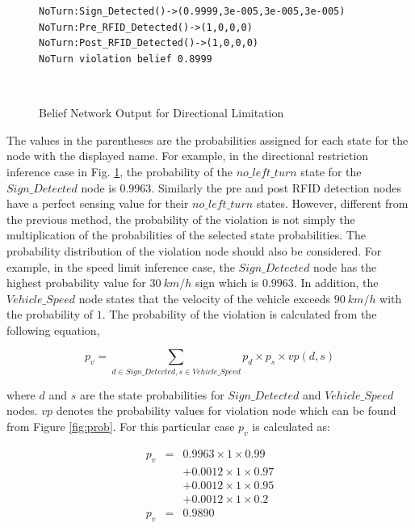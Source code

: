 \documentclass[letterpaper, 10 pt, conference]{ieeeconf}
\newenvironment{mylisting}
{~\par~\begin{list}{}{\setlength{\leftmargin}{1em}}\item\scriptsize\bfseries}
{\end{list}~\par}
\begin{document}
\begin{figure}[thb]
      \centering
		   \begin{mylisting}
\begin{verbatim}
NoTurn:Sign_Detected()->(0.9999,3e-005,3e-005,3e-005)
NoTurn:Pre_RFID_Detected()->(1,0,0,0)
NoTurn:Post_RFID_Detected()->(1,0,0,0)
NoTurn violation belief 0.8999
\end{verbatim}
\end{mylisting}
      \caption{Belief Network Output for Directional Limitation}
      \label{fig:BNDirection}
\end{figure}

The values in the parentheses are the probabilities assigned for each state for the node with the displayed name. For example, in the directional restriction inference case in Fig. \ref{fig:BNDirection},  the probability of the $no\_left\_turn$ state for the $Sign\_Detected$ node is $0.9963$. Similarly the pre and post RFID detection nodes have a perfect sensing value for their $no\_left\_turn$ states. However, different from the previous method, the probability of the violation is not simply the multiplication of the probabilities of the selected state probabilities. The probability distribution of the violation node should also be considered. For example, in the speed limit inference case, the $Sign\_Detected$ node has the highest probability value for $30~km/h$ sign which is $0.9963$. In addition, the $Vehicle\_Speed$ node states that the velocity of the vehicle exceeds $90~km/h$ with the probability of $1$. The probability of the violation is calculated from the following equation,


\begin{equation}
	p_{v} = \sum_{d\in{Sign\_Detected},s\in{Vehicle\_Speed}}p_{d} \times p_{s} \times vp(d,s)
\end{equation}


\noindent
where $d$ and $s$ are the state probabilities for  $Sign\_Detected$ and $Vehicle\_Speed$ nodes. $vp$ denotes the probability values for violation node which can be found from Figure \ref{fig:prob}. For this particular case  $p_{v}$ is calculated as:

\begin{eqnarray*}
p_{v} &=& 0.9963 \times 1 \times 0.99 \\
& & + 0.0012 \times 1 \times 0.97  \\
& & + 0.0012 \times 1 \times 0.95  \\
& & + 0.0012 \times 1 \times 0.2  \\
p_{v} &=& 0.9890
\end{eqnarray*}
\end{document}

